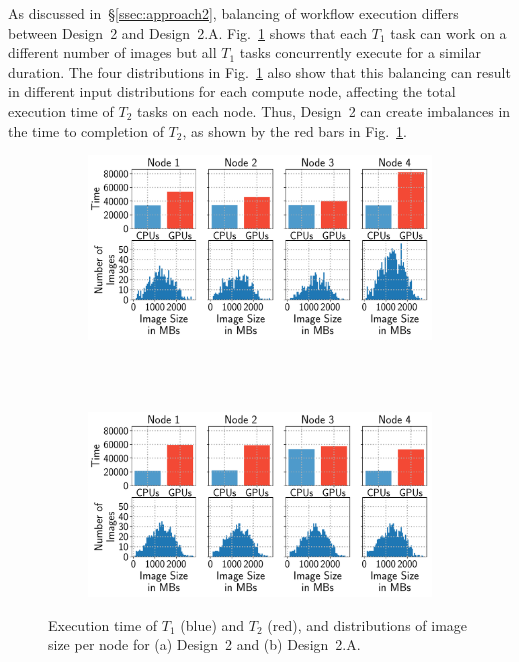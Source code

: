 As discussed in~\S\ref{ssec:approach2}, balancing of workflow execution differs between Design~2 and Design~2.A. Fig.~\ref{fig:design2_timeline} shows that each $T_{1}$ task can work on a different number of images but all $T_{1}$ tasks concurrently execute for a similar duration.
The four distributions in Fig.~\ref{fig:design2_timeline} also show that this balancing can result in different input distributions for each compute node, affecting the total execution time of $T_{2}$ tasks on each node.
Thus, Design~2 can create imbalances in the time to completion of $T_{2}$, as shown by the red bars in Fig.~\ref{fig:design2_timeline}.

\begin{figure}[t]
    \centering
    \begin{subfigure}[b]{0.75\textwidth}
        \includegraphics[width=\linewidth]{figures/designs/design2_timelines.pdf}
        \caption{}
        \label{fig:design2_timeline}
    \end{subfigure}\\
    ~ 
    \begin{subfigure}[b]{0.75\textwidth}
        \includegraphics[width=\linewidth]{figures/designs/design2a_timelines.pdf}
        \caption{}
        \label{fig:design2a_timeline}
    \end{subfigure}
    \caption{Execution time of $T_{1}$ (blue) and $T_{2}$ (red),
        and distributions of image size per node for (a) Design~2 and (b)
        Design~2.A.}
    \label{fig:design_balancing}
\end{figure}


